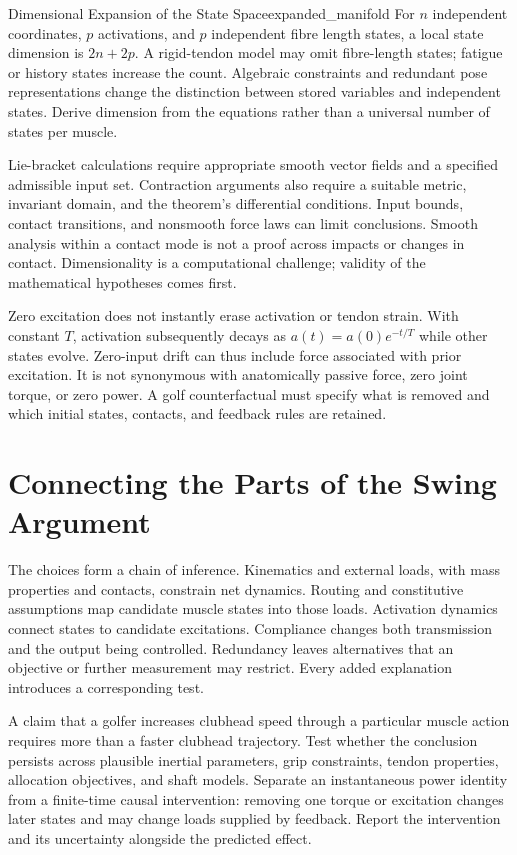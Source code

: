 \begin{remark}{Dimensional Expansion of the State Space}{expanded_manifold}
For $n$ independent coordinates, $p$ activations, and $p$ independent fibre
length states, a local state dimension is $2n+2p$. A rigid-tendon model may
omit fibre-length states; fatigue or history states increase the count.
Algebraic constraints and redundant pose representations change the distinction
between stored variables and independent states. Derive dimension from the
equations rather than a universal number of states per muscle.
\end{remark}

Lie-bracket calculations require appropriate smooth vector fields and a
specified admissible input set. Contraction arguments also require a suitable
metric, invariant domain, and the theorem's differential conditions. Input
bounds, contact transitions, and nonsmooth force laws can limit conclusions.
Smooth analysis within a contact mode is not a proof across impacts or
changes in contact. Dimensionality is a computational challenge; validity of
the mathematical hypotheses comes first.

Zero excitation does not instantly erase activation or tendon strain. With
constant $T$, activation subsequently decays as $a(t)=a(0)e^{-t/T}$ while
other states evolve. Zero-input drift can thus include force associated with
prior excitation. It is not synonymous with anatomically passive force,
zero joint torque, or zero power. A golf counterfactual must specify what is
removed and which initial states, contacts, and feedback rules are retained.

\section{Connecting the Parts of the Swing Argument}

The choices form a chain of inference. Kinematics and external loads, with
mass properties and contacts, constrain net dynamics. Routing and constitutive
assumptions map candidate muscle states into those loads. Activation dynamics
connect states to candidate excitations. Compliance changes both transmission
and the output being controlled. Redundancy leaves alternatives that an
objective or further measurement may restrict. Every added explanation
introduces a corresponding test.

A claim that a golfer increases clubhead speed through a particular muscle
action requires more than a faster clubhead trajectory. Test whether the
conclusion persists across plausible inertial parameters, grip constraints,
tendon properties, allocation objectives, and shaft models. Separate an
instantaneous power identity from a finite-time causal intervention:
removing one torque or excitation changes later states and may change loads
supplied by feedback. Report the intervention and its uncertainty alongside
the predicted effect.

